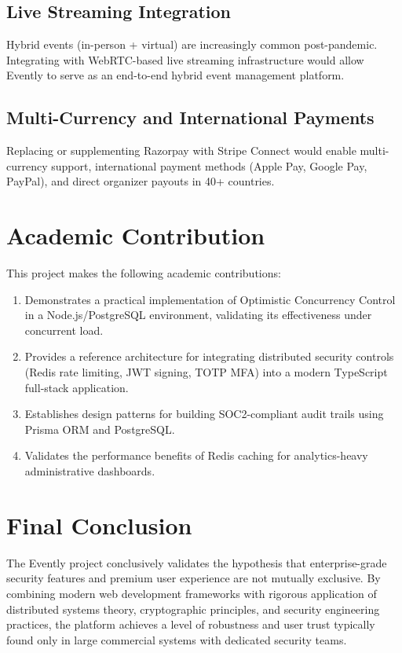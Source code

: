 \documentclass[12pt,a4paper]{report}
\begin{document}
\subsection{Live Streaming Integration}
Hybrid events (in-person + virtual) are increasingly common post-pandemic. Integrating with WebRTC-based live streaming infrastructure would allow Evently to serve as an end-to-end hybrid event management platform.

\subsection{Multi-Currency and International Payments}
Replacing or supplementing Razorpay with Stripe Connect would enable multi-currency support, international payment methods (Apple Pay, Google Pay, PayPal), and direct organizer payouts in 40+ countries.

\section{Academic Contribution}
This project makes the following academic contributions:
\begin{enumerate}[leftmargin=2em]
    \item Demonstrates a practical implementation of Optimistic Concurrency Control in a Node.js/PostgreSQL environment, validating its effectiveness under concurrent load.
    \item Provides a reference architecture for integrating distributed security controls (Redis rate limiting, JWT signing, TOTP MFA) into a modern TypeScript full-stack application.
    \item Establishes design patterns for building SOC2-compliant audit trails using Prisma ORM and PostgreSQL.
    \item Validates the performance benefits of Redis caching for analytics-heavy administrative dashboards.
\end{enumerate}

\section{Final Conclusion}
The Evently project conclusively validates the hypothesis that enterprise-grade security features and premium user experience are not mutually exclusive. By combining modern web development frameworks with rigorous application of distributed systems theory, cryptographic principles, and security engineering practices, the platform achieves a level of robustness and user trust typically found only in large commercial systems with dedicated security teams.
\end{document}
